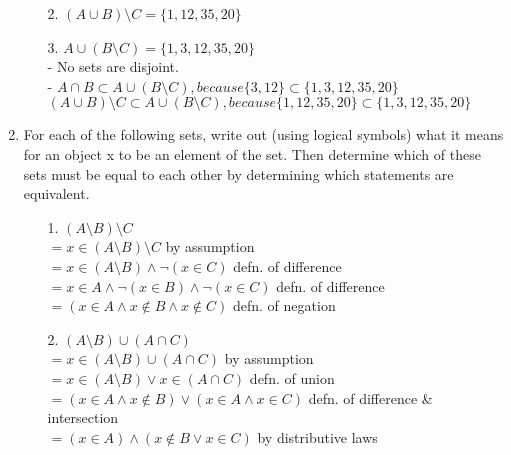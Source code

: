 \documentclass[11pt]{article}
\begin{document}
\begin{enumerate}
\begin{enumerate}
  \item[2.] $(A \cup B) \setminus C = \{1, 12, 35, 20\}$\\


  \item[3.] $A \cup (B \setminus C) = \{1, 3, 12, 35, 20\}$\\

    - No sets are disjoint.\\
    
    - $A \cap B \subset A \cup (B \setminus C) , because \{3, 12\} \subset \{1, 3, 12, 35, 20\}$\\

    $(A \cup B) \setminus C \subset A \cup (B \setminus C) , because \{1, 12, 35, 20\} \subset \{1, 3, 12, 35, 20\}$\\
    
  \end{enumerate}

\newpage
\item For each of the following sets, write out (using logical symbols) what it means for an object x to be an element of the set. Then determine which of these sets must be equal to each other by determining which statements are equivalent.\\

  \begin{enumerate}
  \item[1.] $(A \setminus B) \setminus C$\\

    $= x \in (A \setminus B) \setminus C$      by assumption\\
    $= x \in (A \setminus B) \land \neg(x \in C)$   defn. of difference \\
    $= x \in A \land \neg(x \in B) \land \neg(x \in C)$   defn. of difference\\
    $=(x \in A \land x \notin B \land x \notin C)$   defn. of negation\\

  \item[2.]$(A \setminus B) \cup (A \cap C)$\\

    $= x \in (A \setminus B) \cup (A \cap C)$  by assumption\\
    $= x \in (A \setminus B) \lor x \in (A \cap C)$   defn. of union\\
    $=(x \in A \land x \notin B) \lor (x \in A \land x \in C)$   defn. of difference \& intersection\\
    $=(x \in A ) \land (x \notin B \lor x \in C)$  by distributive laws\\


\end{enumerate}
\end{enumerate}
\end{document}
